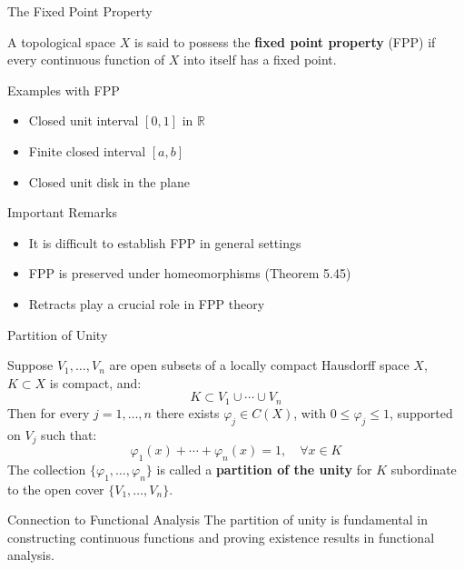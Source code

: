 \documentclass[aspectratio=169,10pt]{beamer}
\begin{document}
\begin{frame}[allowframebreaks]{The Fixed Point Property}
    \begin{definition}[Definition 5.28]
        A topological space $X$ is said to possess the \textbf{fixed point property} (FPP) if every continuous function of $X$ into itself has a fixed point.
    \end{definition}

    \begin{block}{Examples with FPP}
        \begin{itemize}
            \item Closed unit interval $[0, 1]$ in $\mathbb{R}$
            \item Finite closed interval $[a, b]$
            \item Closed unit disk in the plane
        \end{itemize}
    \end{block}

    \begin{block}{Important Remarks}
        \begin{itemize}
            \item It is difficult to establish FPP in general settings
            \item FPP is preserved under homeomorphisms (Theorem 5.45)
            \item Retracts play a crucial role in FPP theory
        \end{itemize}
    \end{block}
\end{frame}

\begin{frame}[allowframebreaks]{Partition of Unity}
    \begin{definition}[Definition 5.29]
        Suppose $V_1, \ldots, V_n$ are open subsets of a locally compact Hausdorff space $X$, $K \subset X$ is compact, and:
        \[
        K \subset V_1 \cup \cdots \cup V_n
        \]
        Then for every $j = 1, \ldots, n$ there exists $\varphi_j \in C(X)$, with $0 \le \varphi_j \le 1$, supported on $V_j$ such that:
        \[
        \varphi_1(x) + \cdots + \varphi_n(x) = 1, \quad \forall x \in K
        \]
        The collection $\{\varphi_1, \ldots, \varphi_n\}$ is called a \textbf{partition of the unity} for $K$ subordinate to the open cover $\{V_1, \ldots, V_n\}$.
    \end{definition}

    \begin{block}{Connection to Functional Analysis}
        The partition of unity is fundamental in constructing continuous functions and proving existence results in functional analysis.
    \end{block}
\end{frame}
\end{document}
